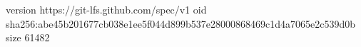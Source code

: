 version https://git-lfs.github.com/spec/v1
oid sha256:abe45b201677cb038e1ee5f044d899b537e28000868469c1d4a7065e2c539d0b
size 61482
